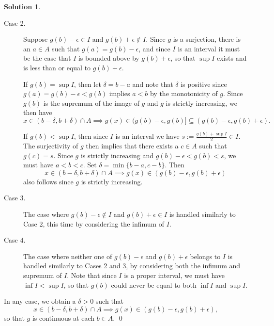 \documentclass[12pt]{article}
\theoremstyle{definition}
\theoremstyle{exercise}
\theoremstyle{solution}
\newtheorem*{solution}{Solution}
\begin{document}
\begin{solution}
\begin{description}
        \item[Case 2.] Suppose \( g(b) - \epsilon \in I \) and \( g(b) + \epsilon \not\in I \). Since \( g \) is a surjection, there is an \( a \in A \) such that \( g(a) = g(b) - \epsilon \), and since \( I \) is an interval it must be the case that \( I \) is bounded above by \( g(b) + \epsilon \), so that \( \sup I \) exists and is less than or equal to \( g(b) + \epsilon \).

        If \( g(b) = \sup I \), then let \( \delta = b - a \) and note that \( \delta \) is positive since \( g(a) = g(b) - \epsilon < g(b) \) implies \( a < b \) by the monotonicity of \( g \). Since \( g(b) \) is the supremum of the image of \( g \) and \( g \) is strictly increasing, we then have
        \[
            x \in (b - \delta, b + \delta) \cap A \implies g(x) \in (g(b) - \epsilon, g(b)] \subseteq (g(b) - \epsilon, g(b) + \epsilon).
        \]
        
        If \( g(b) < \sup I \), then since \( I \) is an interval we have \( s := \tfrac{g(b) + \sup I}{2} \in I \). The surjectivity of \( g \) then implies that there exists a \( c \in A \) such that \( g(c) = s \). Since \( g \) is strictly increasing and \( g(b) - \epsilon < g(b) < s \), we must have \( a < b < c \). Set \( \delta = \min \{ b - a, c - b \} \). Then
        \[
            x \in (b - \delta, b + \delta) \cap A \implies g(x) \in (g(b) - \epsilon, g(b) + \epsilon)
        \]
        also follows since \( g \) is strictly increasing.

        \item[Case 3.] The case where \( g(b) - \epsilon \not\in I \) and \( g(b) + \epsilon \in I \) is handled similarly to Case 2, this time by considering the infimum of \( I \).

        \item[Case 4.] The case where neither one of \( g(b) - \epsilon \) and \( g(b) + \epsilon \) belongs to \( I \) is handled similarly to Cases 2 and 3, by considering both the infimum and supremum of \( I \). Note that since \( I \) is a proper interval, we must have \( \inf I < \sup I \), so that \( g(b) \) could never be equal to both \( \inf I \) and \( \sup I \).
    \end{description}

    In any case, we obtain a \( \delta > 0 \) such that
    \[
        x \in (b - \delta, b + \delta) \cap A \implies g(x) \in (g(b) - \epsilon, g(b) + \epsilon),
    \]
    so that \( g \) is continuous at each \( b \in A \). \qed


\end{solution}
\end{document}
